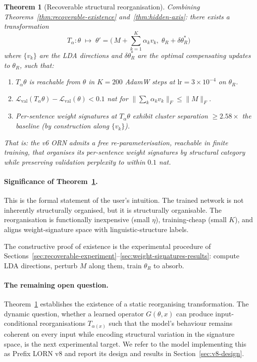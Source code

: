 \documentclass[11pt, a4paper]{article}
\theoremstyle{plain}
\newtheorem{theorem}{Theorem}
\theoremstyle{definition}
\theoremstyle{remark}
\begin{document}
\begin{theorem}[Recoverable structural reorganisation]
\label{thm:reorganisation}
Combining Theorems~\ref{thm:recoverable-existence} and~\ref{thm:hidden-axis}: there exists a transformation
\begin{equation}
T_\alpha : \theta \;\mapsto\; \theta' = \Big(\,M + \sum_{k=1}^{K}\alpha_k v_k,\; \theta_R + \delta\theta_R^{*}\Big)
\end{equation}
where $\{v_k\}$ are the LDA directions and $\delta\theta_R^{*}$ are the optimal compensating updates to $\theta_R$, such that:
\begin{enumerate}[nosep]
\item $T_\alpha \theta$ is reachable from $\theta$ in $K = 200$ AdamW steps at $\mathrm{lr} = 3 \times 10^{-4}$ on $\theta_R$.
\item $\mathcal{L}_{\text{val}}(T_\alpha \theta) - \mathcal{L}_{\text{val}}(\theta) < 0.1$ nat for $\|\sum_k \alpha_k v_k\|_F \leq \|M\|_F$.
\item Per-sentence weight signatures at $T_\alpha \theta$ exhibit cluster separation $\geq 2.58 \times$ the baseline (by construction along $\{v_k\}$).
\end{enumerate}

That is: the v6 ORN admits a free re-parameterisation, reachable in finite training, that organises its per-sentence weight signatures by structural category while preserving validation perplexity to within $0.1$ nat.
\end{theorem}

\paragraph{Significance of Theorem~\ref{thm:reorganisation}.}
This is the formal statement of the user's intuition.
The trained network is not inherently structurally organised, but it is structurally organisable.
The reorganisation is functionally inexpensive (small $\eta$), training-cheap (small $K$), and aligns weight-signature space with linguistic-structure labels.

The constructive proof of existence is the experimental procedure of Sections~\ref{sec:recoverable-experiment}--\ref{sec:weight-signatures-results}: compute LDA directions, perturb $M$ along them, train $\theta_R$ to absorb.

\paragraph{The remaining open question.}
Theorem~\ref{thm:reorganisation} establishes the existence of a static reorganising transformation.
The dynamic question, whether a learned operator $G(\theta, x)$ can produce input-conditional reorganisations $T_{\alpha(x)}$ such that the model's behaviour remains coherent on every input while encoding structural variation in the signature space, is the next experimental target.
We refer to the model implementing this as Prefix LORN v8 and report its design and results in Section~\ref{sec:v8-design}.
\end{document}
